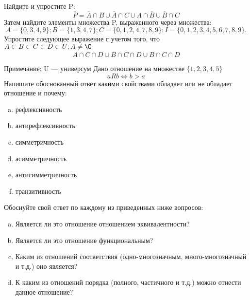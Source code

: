 \documentclass[10pt]{exam}
\begin{document}
\begin{questions}
\question
Найдите и упростите P:
\begin{equation*}
\overline{P} = \overline{A} \cap B \cup \overline{A} \cap C \cup A \cap \overline{B} \cup \overline{B} \cap C
\end{equation*}
Затем найдите элементы множества P, выраженного через множества:
\begin{equation*}
A = \{0, 3, 4, 9\}; 
B = \{1, 3, 4, 7\};
C = \{0, 1, 2, 4, 7, 8, 9\};
I = \{0, 1, 2, 3, 4, 5, 6, 7, 8, 9\}.
\end{equation*}\question
Упростите следующее выражение с учетом того, что $A\subset B \subset C \subset D \subset U; A \neq \O$
\begin{equation*}
A \cap C  \cap D \cup B \cap \overline{C} \cap D \cup B \cap C \cap D
\end{equation*}

Примечание: U — универсум\question
Дано отношение на множестве $\{1, 2, 3, 4, 5\}$ 
\begin{equation*}
aRb \iff b > a
\end{equation*}
Напишите обоснованный ответ какими свойствами обладает или не обладает отношение и почему:   
\begin{enumerate} [a)]\setcounter{enumi}{0}
\item рефлексивность
\item антирефлексивность
\item симметричность
\item асимметричность
\item антисимметричность
\item транзитивность
\end{enumerate}

Обоснуйте свой ответ по каждому из приведенных ниже вопросов:
\begin{enumerate} [a)]\setcounter{enumi}{0}
    \item Является ли это отношение отношением эквивалентности?
    \item Является ли это отношение функциональным?
    \item Каким из отношений соответствия (одно-многозначным, много-многозначный и т.д.) оно является?
    \item К каким из отношений порядка (полного, частичного и т.д.) можно отнести данное отношение?
\end{enumerate}


\end{questions}
\end{document}

